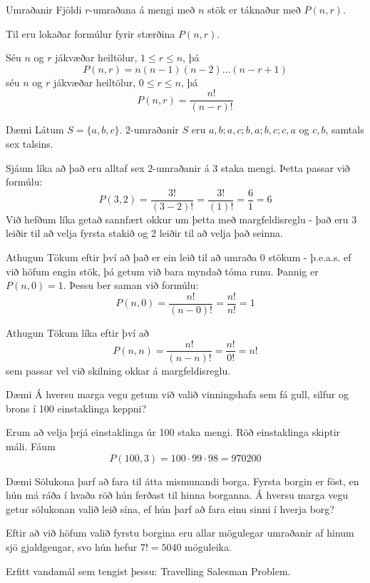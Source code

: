 \documentclass[handout]{beamer}
\begin{document}
\begin{frame}{Umraðanir}
Fjöldi $r$-umraðana á mengi með $n$ stök er táknaður með $P(n, r)$.

Til eru lokaðar formúlur fyrir stærðina $P(n,r)$. 

Séu $n$ og $r$ jákvæðar heiltölur, $1 \leq r \leq n$, þá
\[
 P (n, r) = n(n - 1)(n - 2) \ldots (n - r + 1)
\]
séu $n$ og $r$ jákvæðar heiltölur, $0 \leq r \leq n$, þá
\[
 P(n,r) = \frac{n!}{(n-r)!}
\]
\end{frame}

\begin{frame}{Dæmi}
Látum $S = \{a, b, c\}$. $2$-umraðanir $S$ eru $a, b; a, c; b, a;b, c; c, a$ og $c, b$, samtals sex talsins.

Sjáum líka að það eru alltaf sex $2$-umraðanir á 3 staka mengi. Þetta passar við formúlu:
\[
 P(3,2) = \frac{3!}{(3-2)!} = \frac{3!}{(1)!} = \frac{6}{1} = 6
\]
Við hefðum líka getað sannfært okkur um þetta með margfeldisreglu - það eru 3 leiðir til að velja fyrsta stakið og 2 leiðir til að velja það seinna.
\end{frame}

\begin{frame}{Athugun}
Tökum eftir því að það er ein leið til að umraða 0 stökum - þ.e.a.s. ef við höfum engin stök, þá getum við bara myndað tóma runu. Þannig er $P(n,0) = 1$. Þessu ber saman við formúlu:
\[
 P(n,0) = \frac{n!}{(n-0)!} = \frac{n!}{n!} = 1
\]
\end{frame}

\begin{frame}{Athugun}
Tökum líka eftir því að 
\[
 P(n,n) = \frac{n!}{(n-n)!} = \frac{n!}{0!} = n!
\]
sem passar vel við skilning okkar á margfeldisreglu.
\end{frame}

\begin{frame}{Dæmi}
Á hversu marga vegu getum við valið vinningshafa sem fá gull, silfur og brons í 100 einstaklinga keppni? \pause

Erum að velja þrjá einstaklinga úr 100 staka mengi. Röð einstaklinga skiptir máli. Fáum
\[
 P(100,3) = 100 \cdot 99 \cdot 98 = 970200
\]
\end{frame}

\begin{frame}{Dæmi}
Sölukona þarf að fara til átta mismunandi borga. Fyrsta borgin er föst, en hún má ráða í hvaða röð hún ferðast til hinna borganna. Á hversu marga vegu getur sölukonan valið leið sína, ef hún þarf að fara einu sinni í hverja borg? \pause

Eftir að við höfum valið fyrstu borgina eru allar mögulegar umraðanir af hinum sjö gjaldgengar, svo hún hefur $7! = 5040$ möguleika.

Erfitt vandamál sem tengist þessu: Travelling Salesman Problem.
\end{frame}
\end{document}
